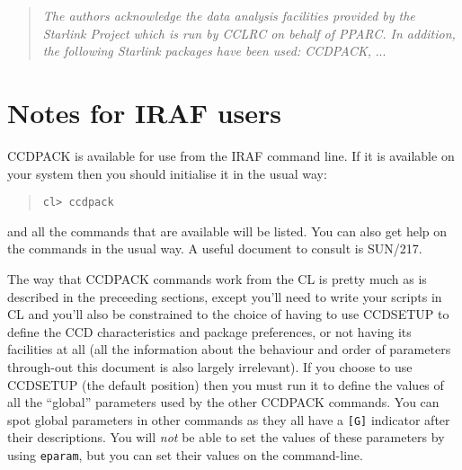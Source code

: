 \documentclass[twoside,11pt]{article}
\newcommand{\xref}[3]{#1}
\newcommand{\xlabel}[1]{}
\renewcommand{\_}{\texttt{\symbol{95}}}
\newcommand{\routine}[1]{{\sc #1}}
\begin{document}
\begin{center}
\begin{quote}
\emph{The authors acknowledge the data analysis facilities provided by
the Starlink Project which is run by CCLRC on behalf of PPARC. In
addition, the following Starlink packages have been used: CCDPACK,} ...
\end{quote}
\end{center}

\newpage
\appendix
\section{Notes for IRAF users \xlabel{IRAFNOTES} \label{IRAFNOTES} }

CCDPACK is available for use from the IRAF command line. If it is
available on your system then you should initialise it in the usual
way:
\begin{quote}
\begin{verbatim}
cl> ccdpack
\end{verbatim}
\end{quote}
and all the commands that are available will be listed. You can also
get help on the commands in the usual way. A useful document to
consult is \xref{SUN/217}{sun217}{}.

The way that CCDPACK commands work from the CL is pretty much as is
described in the preceeding sections, except you'll need to write your
scripts in CL and you'll also be constrained to the choice of having
to use \routine{CCDSETUP} to define the CCD characteristics and
package preferences, or not having its facilities at all (all the
information about the behaviour and order of parameters through-out
this document is also largely irrelevant). If you choose to use
\routine{CCDSETUP} (the default position) then you must run it to
define the values of all the ``global'' parameters used by the other
CCDPACK commands. You can spot global parameters in other commands as
they all have a \verb+[G]+ indicator after their descriptions. You
will {\em{not}} be able to set the values of these parameters by using
\verb+eparam+, but you can set their values on the command-line.
\end{document}
